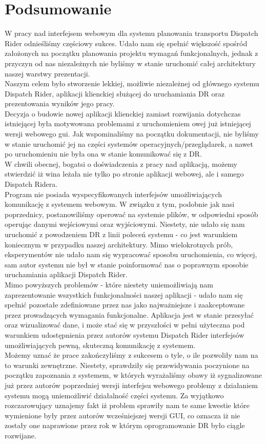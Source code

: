 \chapter{Podsumowanie}

W pracy nad interfejsem webowym dla systemu planowania transportu Dispatch Rider odnieśliśmy częściowy sukces. Udało nam się spełnić większość spośród założonych na początku planowania projektu wymagań funkcjonalnych, jednak z przyczyn od nas niezależnych nie byliśmy w stanie uruchomić całej architektury naszej warstwy prezentacji.\\ 
Naszym celem było stworzenie lekkiej, możliwie niezależnej od głównego systemu Dispatch Rider, aplikacji klienckiej służącej do uruchamiania DR oraz prezentowania wyników jego pracy.\\Decyzja o budowie nowej aplikacji klienckiej zamiast rozwijania dotychczas istniejącej była motywowana problemami z uruchomieniem owej już istniejącej wersji webowego gui. Jak wspominaliśmy na początku dokumentacji, nie byliśmy w stanie uruchomić jej na części systemów operacyjnych/przeglądarek, a nawet po uruchomieniu nie była ona w stanie komunikować się z DR.\\
W chwili obecnej, bogatsi o doświadczenia z pracy nad aplikacją, możemy stwierdzić iż wina leżała nie tylko po stronie aplikacji webowej, ale i samego Dispatch Ridera.\\
Program nie posiada wyspecyfikowanych interfejsów umożliwiających komunikację z systemem webowym. W związku z tym, podobnie jak nasi poprzednicy, postanowiliśmy operować na systemie plików, w odpowiedni sposób operując danymi wejściowymi oraz wyjściowymi.
Niestety, nie udało się nam uruchomić z powodzeniem DR z linii poleceń systemu - co jest warunkiem koniecznym w przypadku naszej architektury. Mimo wielokrotnych prób, eksperymentów nie udało nam się wypracować sposobu uruchomienia, co więcej, sam autor systemu nie był w stanie poinformować nas o poprawnym sposobie uruchamiania aplikacji Dispatch Rider. 
\\
Mimo powyższych problemów - które niestety uniemożliwiają nam zaprezentowanie wszystkich funkcjonalności naszej aplikacji - udało nam się spełnić pozostałe zdefiniowane przez nas jako najważniejsze i zaakceptowane przez prowadzących wymagania funkcjonalne. Aplikacja jest w stanie przesyłać oraz wizualizować dane, i może stać się w przyszłości w pełni użyteczna pod warunkiem udostępnienia przez autorów systemu Dispatch Rider interfejsów umożliwiających pewną, skuteczną komunikację z systemem.\\
Możemy uznać że prace zakończyliśmy z sukcesem o tyle, o ile pozwoliły nam na to warunki zewnętrzne. Niestety, sprawdziły się przewidywania poczynione na początku zapoznania z systemem, w których wyrażaliśmy obawy iż sygnalizowane już przez autorów poprzedniej wersji interfejsu webowego problemy z działaniem systemu mogą uniemożliwić działalność części systemu. Za wyjątkowo rozczarowujący uznajemy fakt iż problem sprawiły nam te same kwestie które wymienione były przez autorów wcześniejszej wersji GUI, co oznacza iż nie zostały one naprawione przez rok w którym oprogramowanie DR było ciągle rozwijane.
\vfill \hfill
\newpage

